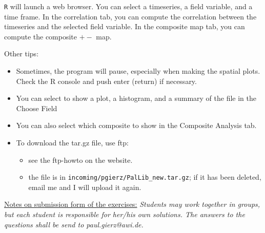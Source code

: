 \documentclass[a4paper,12pt]{article}
\begin{document}
\texttt{R} will launch a web browser. You can select a timeseries, a
field variable, and a time frame. In the correlation tab, you can
compute the correlation between the timeseries and the selected field
variable. In the composite map tab, you can compute the composite $+-$
map.

Other tips:
\begin{itemize}
\item Sometimes, the program will pause, especially when making the
  spatial plots. Check the R console and push enter (return) if necessary.
\item You can select to show a plot, a histogram, and a summary of the
  file in the Choose Field
\item You can also select which composite to show in the Composite
  Analysis tab.
\item To download the tar.gz file, use ftp:

\begin{itemize}
\item see the ftp-howto on the website.
\item the file is in \texttt{incoming/pgierz/PalLib\_new.tar.gz}; if it has been
  deleted, email me and I will upload it again.
\end{itemize}

\end{itemize}

\vfill
\underline{Notes on submission form of the exercises:}
 \textit{Students may work together in groups, but each student is responsible for her/his own solutions. The answers to the questions shall be send to paul.gierz@awi.de.
}
\end{document}
